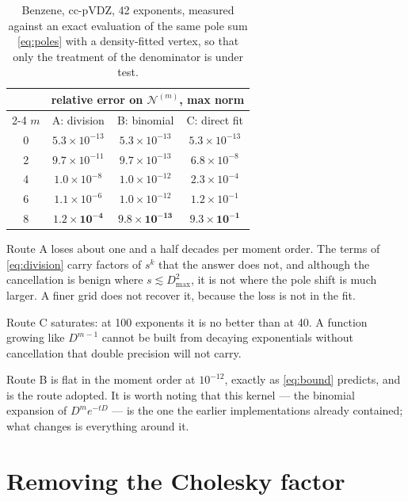 \documentclass[11pt]{article}
\newcommand{\Ncal}{\mathcal{N}}
\begin{document}
\begin{table}[h]
\centering
\begin{tabular}{cccc}
\toprule
& \multicolumn{3}{c}{relative error on $\Ncal^{(m)}$, max norm} \\
\cmidrule(l){2-4}
$m$ & A: division & B: binomial & C: direct fit \\
\midrule
0 & $5.3\times10^{-13}$ & $5.3\times10^{-13}$ & $5.3\times10^{-13}$ \\
2 & $9.7\times10^{-11}$ & $9.7\times10^{-13}$ & $6.8\times10^{-8}$ \\
4 & $1.0\times10^{-8}$  & $1.0\times10^{-12}$ & $2.3\times10^{-4}$ \\
6 & $1.1\times10^{-6}$  & $1.0\times10^{-12}$ & $1.2\times10^{-1}$ \\
8 & $\bm{1.2\times10^{-4}}$ & $\bm{9.8\times10^{-13}}$ & $\bm{9.3\times10^{-1}}$ \\
\bottomrule
\end{tabular}
\caption{Benzene, cc-pVDZ, 42 exponents, measured against an exact evaluation of the same
pole sum \eqref{eq:poles} with a density-fitted vertex, so that only the treatment of the
denominator is under test.}
\label{tab:routes}
\end{table}

Route A loses about one and a half decades per moment order. The terms of
\eqref{eq:division} carry factors of $s^k$ that the answer does not, and although the
cancellation is benign where $s \lesssim D_{\max}^2$, it is not where the pole shift is much
larger. A finer grid does not recover it, because the loss is not in the fit.

Route C saturates: at 100 exponents it is no better than at 40. A function growing like
$D^{m-1}$ cannot be built from decaying exponentials without cancellation that double
precision will not carry.

Route B is flat in the moment order at $10^{-12}$, exactly as \eqref{eq:bound} predicts,
and is the route adopted. It is worth noting that this kernel --- the binomial expansion of
$D^m e^{-tD}$ --- is the one the earlier implementations already contained; what changes is
everything around it.

\section{Removing the Cholesky factor}
\end{document}
